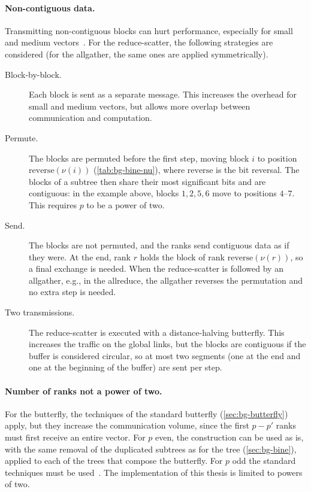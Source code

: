 \paragraph{Non-contiguous data.}
Transmitting non-contiguous blocks can hurt performance, especially for small and medium vectors~\cite{desensi2025bine}.
For the reduce-scatter, the following strategies are considered (for the allgather, the same ones are applied symmetrically).
\begin{description}
  \item[Block-by-block.] Each block is sent as a separate message. This increases the overhead for small and medium vectors, but allows more overlap between communication and computation.
  \item[Permute.] The blocks are permuted before the first step, moving block $i$ to position $\mathrm{reverse}(\nu(i))$ (\cref{tab:bg-bine-nu}), where $\mathrm{reverse}$ is the bit reversal. The blocks of a subtree then share their most significant bits and are contiguous: in the example above, blocks $1,2,5,6$ move to positions $4$--$7$. This requires $p$ to be a power of two.
  \item[Send.] The blocks are not permuted, and the ranks send contiguous data as if they were. At the end, rank $r$ holds the block of rank $\mathrm{reverse}(\nu(r))$, so a final exchange is needed. When the reduce-scatter is followed by an allgather, e.g., in the allreduce, the allgather reverses the permutation and no extra step is needed.
  \item[Two transmissions.] The reduce-scatter is executed with a distance-halving butterfly. This increases the traffic on the global links, but the blocks are contiguous if the buffer is considered circular, so at most two segments (one at the end and one at the beginning of the buffer) are sent per step.
\end{description}

\paragraph{Number of ranks not a power of two.}
For the butterfly, the techniques of the standard butterfly (\cref{sec:bg-butterfly}) apply, but they increase the communication volume, since the first $p-p'$ ranks must first receive an entire vector.
For $p$ even, the construction can be used as is, with the same removal of the duplicated subtrees as for the \bine{} tree (\cref{sec:bg-bine}), applied to each of the trees that compose the butterfly.
For $p$ odd the standard techniques must be used~\cite{desensi2025bine}.
The implementation of this thesis is limited to powers of two.
